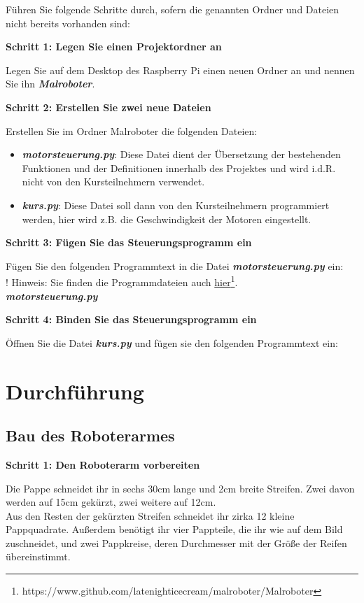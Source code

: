 \documentclass[12pt]{article}
\newcommand{\hinweis}{\textcolor{stringColor}{! Hinweis: }}
\let\oldemph\emph
\renewcommand{\emph}[1]{\textbf{\oldemph{#1}}}
\newcommand{\schritt}[3]{
\begin{tcolorbox}
  \textbf{Schritt #1: #2}
\end{tcolorbox}
#3
}
\begin{document}
Führen Sie folgende Schritte durch, sofern die genannten Ordner und Dateien nicht bereits vorhanden sind:\\

\schritt{1}{Legen Sie einen Projektordner an}{

  Legen Sie auf dem Desktop des Raspberry Pi einen neuen Ordner an und nennen Sie ihn \emph{Malroboter}.\\

}

\schritt{2}{Erstellen Sie zwei neue Dateien}{

  Erstellen Sie im Ordner Malroboter die folgenden Dateien:
  \begin{itemize}
  \item \emph{motorsteuerung.py}: Diese Datei dient der Übersetzung der bestehenden Funktionen und der Definitionen innerhalb des Projektes und wird i.d.R. nicht von den Kursteilnehmern verwendet.
  \item \emph{kurs.py}: Diese Datei soll dann von den Kursteilnehmern programmiert werden, hier wird z.B. die Geschwindigkeit der Motoren eingestellt. 
  \end{itemize}


}

\schritt{3}{Fügen Sie das Steuerungsprogramm ein}{

 Fügen Sie den folgenden Programmtext in die Datei \emph{motorsteuerung.py} ein:\\
  \indent \hinweis Sie finden die Programmdateien auch \href{https://www.github.com/latenighticecream/malroboter/Malroboter}{hier}\footnote[2]{https://www.github.com/latenighticecream/malroboter/Malroboter}.\\

}

\emph{motorsteuerung.py}\\

\vspace{\baselineskip}

\schritt{4}{Binden Sie das Steuerungsprogramm ein}{
Öffnen Sie die Datei \emph{kurs.py} und fügen sie den folgenden Programmtext ein:

}


\section{Durchführung}

\subsection{Bau des Roboterarmes}
\schritt{1}{Den Roboterarm vorbereiten}{
Die Pappe schneidet ihr in sechs 30cm lange und 2cm breite Streifen.
Zwei davon werden auf 15cm gekürzt, zwei weitere auf 12cm.\\

Aus den Resten der gekürzten Streifen schneidet ihr zirka 12 kleine Pappquadrate.
Außerdem benötigt ihr vier Pappteile, die ihr wie auf dem Bild zuschneidet, und zwei Pappkreise, deren Durchmesser mit der Größe der Reifen übereinstimmt.\\
}
\end{document}
